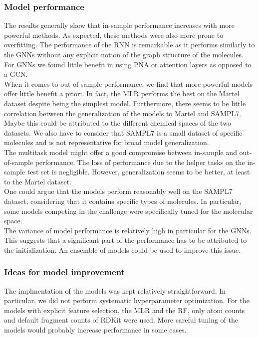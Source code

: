 \documentclass{article}
\theoremstyle{definition}
\theoremstyle{remark}
\begin{document}
\subsubsection{Model performance}

The results generally show that in-sample performance increases with more powerful methods. As expected, these methods were also more prone to overfitting. The performance of the RNN is remarkable as it performs similarly to the GNNs without any explicit notion of the graph structure of the molecules. For GNNs we found little benefit in using PNA or attention layers as opposed to a GCN. \\

When it comes to out-of-sample performance, we find that more powerful models offer little benefit a priori. In fact, the MLR performs the best on the Martel dataset despite being the simplest model. Furthermore, there seems to be little correlation between the generalization of the models to Martel and SAMPL7. Maybe this could be attributed to the different chemical spaces of the two datasets. We also have to consider that SAMPL7 is a small dataset of specific molecules and is not representative for broad model generalization. \\

The multitask model might offer a good compromise between in-sample and out-of-sample performance. The loss of performance due to the helper tasks on the in-sample test set is negligible. However, generalization seems to be better, at least to the Martel dataset. \\

One could argue that the models perform reasonably well on the SAMPL7 dataset, considering that it contains specific types of molecules. In particular, some models competing in the challenge were specifically tuned for the molecular space. \\

The variance of model performance is relatively high in particular for the GNNs. This suggests that a significant part of the performance has to be attributed to the initialization. An ensemble of models could be used to improve this issue. \\

\subsubsection{Ideas for model improvement}

The implmentation of the models was kept relatively straightforward. In particular, we did not perform systematic hyperparameter optimization. For the models with explicit feature selection, the MLR and the RF, only atom counts and default fragment counts of RDKit were used. More careful tuning of the models would probably increase performance in some cases. \\
\end{document}
